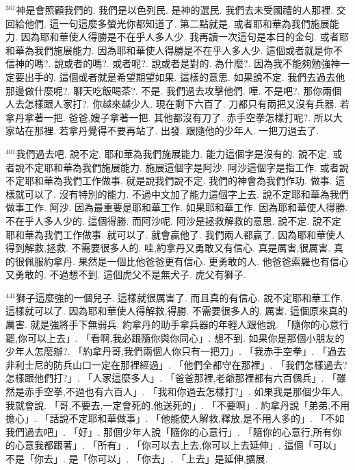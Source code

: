 \documentclass{book}
\begin{document}
$^{361}$神是會照顧我們的.
我們是以色列民.
是神的選民.
我們去未受國禮的人那裡.
交回給他們.
這一句這麼多螢光你都知道了.
第二點就是.
或者耶和華為我們施展能力.
因為耶和華使人得勝是不在乎人多人少.
我再讀一次這句是本日的金句.
或者耶和華為我們施展能力.
因為耶和華使人得勝是不在乎人多人少.
這個或者就是你不信神的嗎?.
說或者的嗎?.
或者呢?.
說或者是對的.
為什麼?.
因為我不能夠勉強神一定要出手的.
這個或者就是希望期望如果.
這樣的意思.
如果說不定.
我們去過去他那邊做什麼呢?.
聊天吃飯喝茶?.
不是.
我們過去攻擊他們.
嘩.
不是吧?.
那你兩個人去怎樣跟人家打?.
你越來越少人.
現在剩下六百了.
刀都只有兩把又沒有兵器.
若拿丹拿著一把.
爸爸,嫂子拿著一把.
其他都沒有刀了.
赤手空拳怎樣打呢?.
所以大家站在那裡.
若拿丹覺得不要再站了.
出發.
跟隨他的少年人.
一把刀過去了.

$^{401}$我們過去吧.
說不定.
耶和華為我們施展能力.
能力這個字是沒有的.
說不定.
或者說不定耶和華為我們施展能力.
施展這個字是阿沙.
阿沙這個字是指工作.
或者說不定耶和華為我們工作做事.
就是說我們說不定.
我們的神會為我們作功.
做事.
這樣就可以了.
沒有特別的能力.
不過中文加了能力這個字上去.
說不定耶和華為我們做事工作.
阿沙.
因為最重要是耶和華工作.
如果耶和華工作.
因為耶和華使人得勝.
不在乎人多人少的.
這個得勝.
而阿沙呢.
阿沙是拯救解救的意思.
說不定.
說不定耶和華為我們工作做事.
就可以了.
就會贏他了.
我們兩人都贏了.
因為耶和華使人得到解救,拯救.
不需要很多人的.
哇,約拿丹又勇敢又有信心.
真是厲害,很厲害.
真的很佩服約拿丹.
果然是一個比他爸爸更有信心.
更勇敢的人.
他爸爸索羅也有信心又勇敢的.
不過想不到.
這個虎父不是無犬子.
虎父有獅子.

$^{441}$獅子這麼強的一個兒子.
這樣就很厲害了.
而且真的有信心.
說不定耶和華工作.
這樣就可以了.
因為耶和華使人得解救,得勝.
不需要很多人的.
厲害.
這個原來真的厲害.
就是強將手下無弱兵.
約拿丹的助手拿兵器的年輕人跟他說.
「隨你的心意行罷,你可以上去」.
「看啊,我必跟隨你與你同心」.
想不到.
如果你是那個小朋友的少年人怎麼辦?.
「約拿丹哥,我們兩個人你只有一把刀」.
「我赤手空拳」.
「過去非利士尼的防兵山口一定在那裡經過」.
「他們全都守在那裡」.
「我們怎樣過去?怎樣跟他們打?」.
「人家這麼多人」.
「爸爸那裡,老爺那裡都有六百個兵」.
「雖然是赤手空拳,不過也有六百人」.
「我和你過去怎樣打?」.
如果我是那個少年人,我就會說.
「哥,不要去,一定會死的,他送死的」.
「不要啊」.
約拿丹說「弟弟,不用擔心」.
「話說不定耶和華做事」.
「他能使人解救,釋放,是不用人多的」.
「不如我們過去吧」.
「好」.
那個少年人說「隨你的心意行」.
「隨你的心意行,所有你的心意我都跟著」.
「所有」.
「你可以去上去,你可以上去延伸」.
這個「可以」不是「你去」.
是「你可以」.
「你去」.
「上去」是延伸,擴展.
\end{document}
